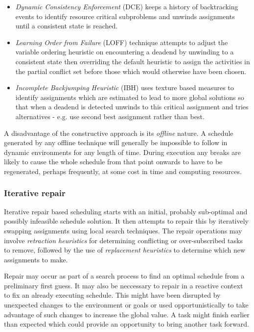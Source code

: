 \begin{description}
\begin{itemize} 
\item \emph{Dynamic Consistency Enforcement} (DCE) keeps a history of backtracking events to identify resource critical subproblems and unwinds assignments until a consistent state is reached.
\item \emph{Learning Order from Failure} (LOFF) technique attempts to adjust the variable ordering heuristic on encountering a deadend by unwinding to a consistent state then overriding the default heuristic to assign the activities in the partial conflict set before those which would otherwise have been chosen.
\item \emph{Incomplete Backjumping Heuristic} (IBH) uses texture based measures \citep{beck97texturebased} to identify assignments which are estimated to lead to more global solutions so that when a deadend is detected unwinds to this critical assignment and tries alternatives - e.g. use second best assignment rather than best. 
\end{itemize}

\end{description}

A disadvantage of the constructive approach is its \emph{offline} nature. A schedule generated by any offline technique will generally be impossible to follow in dynamic environments for any length of time. During execution any breaks are likely to cause the whole schedule from that point onwards to have to be regenerated, perhaps frequently, at some cost in time and computing resources.

%
%
\subsubsection{Iterative repair}
\label{sub:review_iterative}
Iterative repair based scheduling starts with an initial, probably sub-optimal and possibly infeasible schedule solution. It then  attempts to repair this by iteratively swapping assignments using local search techniques. The repair operations may involve \emph{retraction heuristics} for determining conflicting or over-subscribed tasks to remove, followed by the use of \emph{replacement heuristics} to determine which new assignments to make. 

Repair may occur as part of a search process to find an optimal schedule from a preliminary first guess. It may also be neccessary to repair in a reactive context to fix an already executing schedule. This might have been disrupted by unexpected changes to the environment or goals or used opportunistically to take advantage of such changes to increase the global value. A task might finish earlier than expected which could provide an opportunity to bring another task forward.

